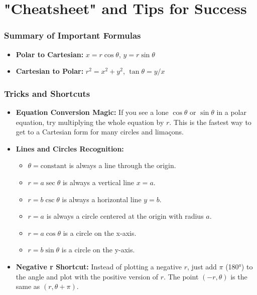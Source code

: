 \documentclass{article}
\begin{document}
\part{"Cheatsheet" and Tips for Success}

\section{Summary of Important Formulas}
\begin{itemize}
    \item \textbf{Polar to Cartesian:} \(x = r\cos\theta\), \(y = r\sin\theta\)
    \item \textbf{Cartesian to Polar:} \(r^2 = x^2+y^2\), \(\tan\theta = y/x\)
\end{itemize}

\section{Tricks and Shortcuts}
\begin{itemize}
    \item \textbf{Equation Conversion Magic:} If you see a lone \(\cos\theta\) or \(\sin\theta\) in a polar equation, try multiplying the whole equation by \(r\). This is the fastest way to get to a Cartesian form for many circles and limaçons.
    \item \textbf{Lines and Circles Recognition:}
        \begin{itemize}
            \item \(\theta = \text{constant}\) is always a line through the origin.
            \item \(r = a\sec\theta\) is always a vertical line \(x=a\).
            \item \(r = b\csc\theta\) is always a horizontal line \(y=b\).
            \item \(r = a\) is always a circle centered at the origin with radius \(a\).
            \item \(r = a\cos\theta\) is a circle on the x-axis.
            \item \(r = b\sin\theta\) is a circle on the y-axis.
        \end{itemize}
    \item \textbf{Negative r Shortcut:} Instead of plotting a negative \(r\), just add \(\pi\) (180°) to the angle and plot with the positive version of \(r\). The point \((-r, \theta)\) is the same as \((r, \theta+\pi)\).
\end{itemize}
\end{document}
